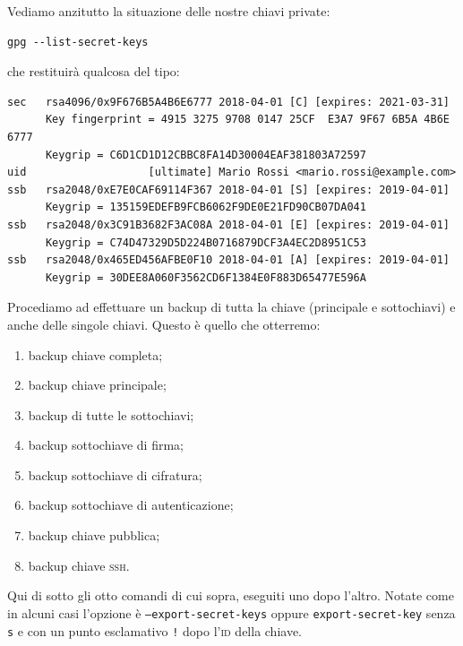 \documentclass[a4paper,10pt]{article}
\begin{document}
Vediamo anzitutto la situazione delle nostre chiavi private:

\begin{lstlisting}
gpg --list-secret-keys
\end{lstlisting}

che restituirà qualcosa del tipo:

\begin{lstlisting}
sec   rsa4096/0x9F676B5A4B6E6777 2018-04-01 [C] [expires: 2021-03-31]
      Key fingerprint = 4915 3275 9708 0147 25CF  E3A7 9F67 6B5A 4B6E 6777
      Keygrip = C6D1CD1D12CBBC8FA14D30004EAF381803A72597
uid                   [ultimate] Mario Rossi <mario.rossi@example.com>
ssb   rsa2048/0xE7E0CAF69114F367 2018-04-01 [S] [expires: 2019-04-01]
      Keygrip = 135159EDEFB9FCB6062F9DE0E21FD90CB07DA041
ssb   rsa2048/0x3C91B3682F3AC08A 2018-04-01 [E] [expires: 2019-04-01]
      Keygrip = C74D47329D5D224B0716879DCF3A4EC2D8951C53
ssb   rsa2048/0x465ED456AFBE0F10 2018-04-01 [A] [expires: 2019-04-01]
      Keygrip = 30DEE8A060F3562CD6F1384E0F883D65477E596A
\end{lstlisting}

Procediamo ad effettuare un backup di tutta la chiave (principale e sottochiavi) e anche delle singole chiavi. Questo è quello che otterremo:

\begin{enumerate}
 \item backup chiave completa;
 \item backup chiave principale;
 \item backup di tutte le sottochiavi;
 \item backup sottochiave di firma;
 \item backup sottochiave di cifratura;
 \item backup sottochiave di autenticazione;
 \item backup chiave pubblica;
 \item backup chiave \textsc{ssh}.
\end{enumerate}


Qui di sotto gli otto comandi di cui sopra, eseguiti uno dopo l'altro. Notate come in alcuni casi l'opzione è \texttt{--export-secret-keys} oppure \texttt{export-secret-key} senza \texttt{s} e con un punto esclamativo \texttt{!} dopo l'\textsc{id} della chiave.
\end{document}
